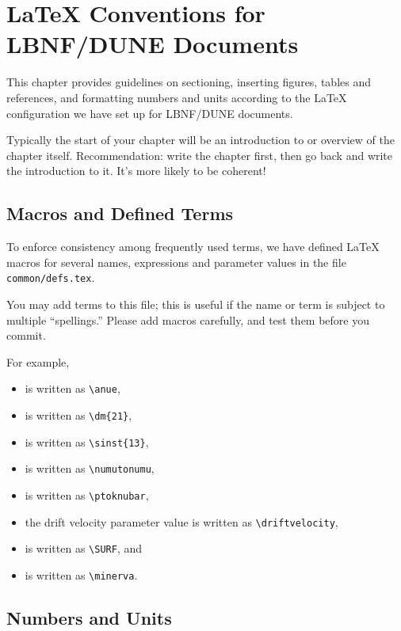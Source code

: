 
\chapter{\LaTeX{} Conventions for LBNF/DUNE Documents}
\label{ch:latex-stds}

This chapter provides guidelines on sectioning, inserting figures, tables and references, and formatting numbers and units according to the \LaTeX{} configuration we have set up for LBNF/DUNE documents.

Typically the start of your chapter will be an introduction to or overview of the chapter itself. Recommendation: write the chapter first, then go back and write the introduction to it. It's more likely to be coherent!


\section{Macros and Defined Terms}
\label{sec:latex-terms}

To enforce consistency among frequently used terms, we have defined \LaTeX{} macros for several names, expressions and parameter values in the file \texttt{common/defs.tex}.  

You may add terms
to this file; this is useful if the name or term is subject
to multiple ``spellings.''  Please add macros carefully, and test them before you commit. 

For example,
\begin{itemize}
\item \anue is written as \verb|\anue|,
\item {} is written as \verb|\dm{21}|,
\item {} is written as \verb|\sinst{13}|,
\item \numutonumu is written as \verb|\numutonumu|,
\item \ptoknubar is written as \verb|\ptoknubar|,
\item the drift velocity parameter value \driftvelocity is written as \verb|\driftvelocity|,
\item \SURF is written as \verb|\SURF|, and
\item \minerva is written as \verb|\minerva|.
\end{itemize}

\section{Numbers and Units}

